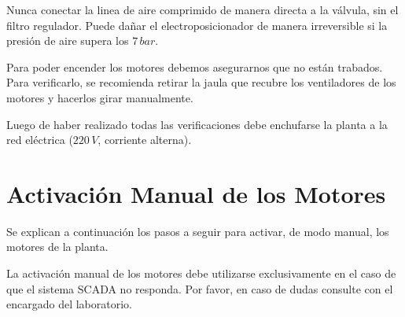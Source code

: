 \begin{lattention}
Nunca conectar la linea de aire comprimido de manera directa a la válvula,
sin el filtro regulador.
Puede dañar el electroposicionador de manera irreversible si la presión de aire
supera los $7\,bar$.
\end{lattention}

\begin{tcolorbox}[title=Motores]
Para poder encender los motores debemos asegurarnos que no están trabados.
Para verificarlo, se recomienda retirar la jaula que recubre los ventiladores
de los motores y hacerlos girar manualmente.
\end {tcolorbox}

\begin{lattention}
Luego de haber realizado todas las verificaciones debe enchufarse la planta a
la red eléctrica ($220\,V$, corriente alterna).
\end{lattention}

\section{Activación Manual de los Motores}
\label{anexo:motoresManual}
Se explican a continuación los pasos a seguir para activar, de modo manual, los
motores de la planta.
 \begin{lattention}
 La activación manual de los motores debe utilizarse exclusivamente en el caso
de que el sistema SCADA no responda.
Por favor, en caso de dudas consulte con el encargado del laboratorio.
\end{lattention}


